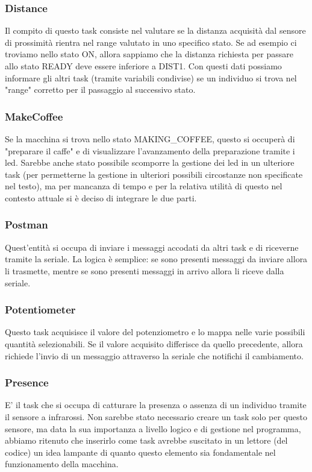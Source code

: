 \documentclass{article}
\begin{document}
\subsubsection{Distance}
Il compito di questo task consiste nel valutare se la distanza acquisità dal sensore di prossimità rientra nel range valutato in uno specifico stato. Se ad esempio ci troviamo nello stato ON, allora sappiamo che la distanza richiesta per passare allo stato READY deve essere inferiore a DIST1. Con questi dati possiamo informare gli altri task (tramite variabili condivise) se un individuo si trova nel "range" corretto per il passaggio al successivo stato.

\subsubsection{MakeCoffee}
Se la macchina si trova nello stato MAKING\_COFFEE, questo si occuperà di "preparare il caffe" e di visualizzare l'avanzamento della preparazione tramite i led. Sarebbe anche stato possibile scomporre la gestione dei led in un ulteriore task (per permetterne la gestione in ulteriori possibili circostanze non specificate nel testo), ma per mancanza di tempo e per la relativa utilità di questo nel contesto attuale si è deciso di integrare le due parti.

\subsubsection{Postman}
Quest'entità si occupa di inviare i messaggi accodati da altri task e di riceverne tramite la seriale. La logica è semplice: se sono presenti messaggi da inviare allora li trasmette, mentre se sono presenti messaggi in arrivo allora li riceve dalla seriale.

\subsubsection{Potentiometer}
Questo task acquisisce il valore del potenziometro e lo mappa nelle varie possibili quantità selezionabili. Se il valore acquisito differisce da quello precedente, allora richiede l'invio di un messaggio attraverso la seriale che notifichi il cambiamento.

\subsubsection{Presence}
E' il task che si occupa di catturare la presenza o assenza di un individuo tramite il sensore a infrarossi. Non sarebbe stato necessario creare un task solo per questo sensore, ma data la sua importanza a livello logico e di gestione nel programma, abbiamo ritenuto che inserirlo come task avrebbe suscitato in un lettore (del codice) un idea lampante di quanto questo elemento sia fondamentale nel funzionamento della macchina.
\end{document}
